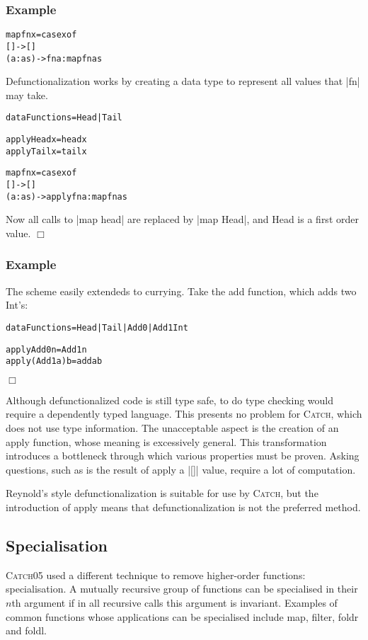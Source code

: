 \documentclass[preprint]{sigplanconf}
\newcommand{\C}[1]{\textsf{#1}}
\newcommand{\catch}{\textsc{Catch}}
\newcounter{exmp}
\newcommand{\yesexample}{\subsubsection*{Example \arabic{exmp}}\addtocounter{exmp}{1}}
\newcommand{\noexample}{\hfill$\Box$}
\newenvironment{code}{\begin{alltt}\small}{\end{alltt}}
\newenvironment{example}{\yesexample}{\noexample}
\begin{document}
\begin{example}
\begin{code}
map fn x = case  x of
                 []      -> []
                 (a:as)  -> fn a : map fn as
\end{code}

Defunctionalization works by creating a data type to represent all values that |fn| may take.

\begin{code}
data Functions = Head | Tail

apply Head  x = head  x
apply Tail  x = tail  x

map fn x = case  x of
                 []      -> []
                 (a:as)  -> apply fn a : map fn as
\end{code}

Now all calls to |map head| are replaced by |map Head|, and \C{Head} is a first order value.
\end{example}

\begin{example}
The scheme easily extendeds to currying. Take the \C{add} function, which adds two \C{Int}'s:

\begin{code}
data Functions = Head | Tail | Add0 | Add1 Int

apply Add0      n  = Add1 n
apply (Add1 a)  b  = add a b
\end{code}
\end{example}

Although defunctionalized code is still type safe, to do type checking would require a dependently typed language. This presents no problem for \catch{}, which does not use type information. The unacceptable aspect is the creation of an \C{apply} function, whose meaning is excessively general. This transformation introduces a bottleneck through which various properties must be proven. Asking questions, such as is the result of \C{apply} a |[]| value, require a lot of computation.

Reynold's style defunctionalization is suitable for use by \catch{}, but the introduction of \C{apply} means that defunctionalization is not the preferred method.

\subsection{Specialisation}

\catch05 used a different technique to remove higher-order functions: specialisation. A mutually recursive group of functions can be specialised in their $n$th argument if in all recursive calls this argument is invariant. Examples of common functions whose applications can be specialised include \C{map}, \C{filter}, \C{foldr} and \C{foldl}.
\end{document}
